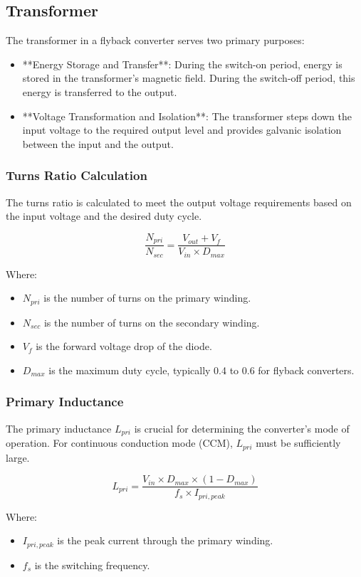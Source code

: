 \documentclass{article}
\begin{document}
\subsection{Transformer}
The transformer in a flyback converter serves two primary purposes:
\begin{itemize}
    \item **Energy Storage and Transfer**: During the switch-on period, energy is stored in the transformer's magnetic field. During the switch-off period, this energy is transferred to the output.
    \item **Voltage Transformation and Isolation**: The transformer steps down the input voltage to the required output level and provides galvanic isolation between the input and the output.
\end{itemize}

\subsubsection{Turns Ratio Calculation}
The turns ratio is calculated to meet the output voltage requirements based on the input voltage and the desired duty cycle.

\[
\frac{N_{pri}}{N_{sec}} = \frac{V_{out} + V_{f}}{V_{in} \times D_{max}}
\]

Where:
\begin{itemize}
    \item $N_{pri}$ is the number of turns on the primary winding.
    \item $N_{sec}$ is the number of turns on the secondary winding.
    \item $V_{f}$ is the forward voltage drop of the diode.
    \item $D_{max}$ is the maximum duty cycle, typically 0.4 to 0.6 for flyback converters.
\end{itemize}

\subsubsection{Primary Inductance}
The primary inductance $L_{pri}$ is crucial for determining the converter’s mode of operation. For continuous conduction mode (CCM), $L_{pri}$ must be sufficiently large.

\[
L_{pri} = \frac{V_{in} \times D_{max} \times (1 - D_{max})}{f_s \times I_{pri, peak}}
\]

Where:
\begin{itemize}
    \item $I_{pri, peak}$ is the peak current through the primary winding.
    \item $f_s$ is the switching frequency.
\end{itemize}
\end{document}
